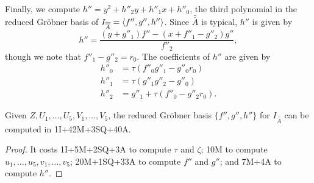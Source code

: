 \begin{comment}
\begin{align*}
  G_3 &= u_5 \\
  f''_2 &= u_5(u_5 - c_8) + u_4 - v_5 \\
  G_2 &= v_4 + v_5(u_5 - c_8) + \tau(u_5(u_5(u_3 - c_6) + v_5(u_4 - c_7) + c_5 - v_3) + v_5(u_3 - v_4) - u_2) \\
  e_3 &= f''_2v_5 - G_2u_5 \\
  f''_1 &= u_5(u_4 - c_7) + G_2 + u_3 - v_4 \\
  G_1 &= u_5(c_6 - u_3) - e_3 + v_3 \\
  f''_0 &= c_7e_3 + u_5(u_2 - c_4) + G_2u_3 + G_1u_4 - f''_2v_3 - f''_1v_4 + u_1 - v_2 \\
  G_0 &= -c_6e_3 + u_5(c_3 - u_1) - G_1u_3 + f''_1v_3 + v_1.
\end{align*}
\end{comment}

Finally, we compute $h'' = y^2 + h''_2y + h''_1x + h''_0$,
the third polynomial in the reduced Gr\"obner basis of $I_{\overline{\overline A}} = \left\langle f'', g'', h'' \right\rangle$.
Since $\bar{\bar A}$ is typical, $h''$ is given by
\[ h'' = \frac {(y + g''_1)f'' - (x + f''_1 - g''_2)g''} {f''_2}, \]
though we note that $f''_1 - g''_2 = r_0$.
The coefficients of $h''$ are given by
\begin{align*}
  h''_0 &= \tau(f''_0g''_1 - g''_0r_0) \\
  h''_1 &= \tau(g''_1g''_2 - g''_0) \\
  h''_2 &= g''_1 + \tau(f''_0 - g''_2r_0).
\end{align*}

\begin{lemma}
  \label{lem_fgh_op_count}
  Given $Z, U_1, \ldots, U_5, V_1, \ldots, V_5$,
  the reduced Gr\"obner basis $\{f'',g'',h''\}$ for $I_{\bar{\bar A}}$ can be computed in 1I+42M+3SQ+40A.
\end{lemma}
\begin{proof}
  It costs 1I+5M+2SQ+3A to compute $\tau$ and $\zeta$;
  10M to compute $u_1, \ldots, u_5, v_1, \ldots, v_5$;
  20M+1SQ+33A to compute $f''$ and $g''$; and
  7M+4A to compute $h''$.
\end{proof}




